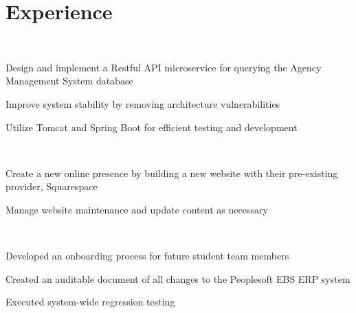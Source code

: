 \documentclass[]{hieudo-build}
\begin{document}
\begin{minipage}[t]{0.65\textwidth} 

\section{Experience}

\\
\vspace{0.9em} %
\begin{tightemize}
\item Design and implement a Restful API microservice for querying the Agency Management System database
\item Improve system stability by removing architecture vulnerabilities
\item Utilize Tomcat and Spring Boot for efficient testing and development
\end{tightemize}
\sectionsep

 \\
\begin{tightemize}
\item Create a new online presence by building a new website with their pre-existing provider, Squarespace
\item Manage website maintenance and update content as necessary
\end{tightemize}
\sectionsep

 \\
\begin{tightemize}
\item Developed an onboarding process for future student team members
\item Created an auditable document of all changes to the Peoplesoft EBS ERP system
\item Executed system-wide regression testing
\end{tightemize}
\sectionsep


\end{minipage}
\end{document}
